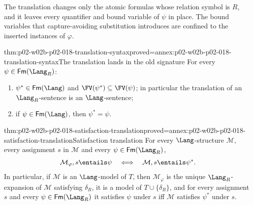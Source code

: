 The translation changes only the atomic formulas whose relation symbol is
\(R\), and it leaves every quantifier and bound variable of \(\psi\) in
place.  The bound variables that capture-avoiding substitution introduces
are confined to the inserted instances of \(\varphi\).

\begin{hblemma}{thm:p02-w02b-p02-018-translation-syntax}{proved=annex:p02-w02b-p02-018-translation-syntax}{The translation lands in the old signature}
For every \(\psi\in\mathsf{Fm}(\Lang_R)\):
\begin{enumerate}
 \item \(\psi^{*}\in\mathsf{Fm}(\Lang)\) and
       \(\FV(\psi^{*})\subseteq\FV(\psi)\); in particular the translation
       of an \(\Lang_R\)-sentence is an \(\Lang\)-sentence;
 \item if \(\psi\in\mathsf{Fm}(\Lang)\), then \(\psi^{*}=\psi\).
\end{enumerate}
\end{hblemma}

\begin{hbtheorem}{thm:p02-w02b-p02-018-satisfaction-translation}{proved=annex:p02-w02b-p02-018-satisfaction-translation}{Satisfaction translation}
For every \(\Lang\)-structure \(\mathcal M\), every assignment \(s\) in
\(\mathcal M\) and every \(\psi\in\mathsf{Fm}(\Lang_R)\),
\[
 \mathcal M_{\varphi},s\entails\psi
 \quad\Longleftrightarrow\quad
 \mathcal M,s\entails\psi^{*}.
\]
In particular, if \(\mathcal M\) is an \(\Lang\)-model of \(T\), then
\(\mathcal M_{\varphi}\) is the unique \(\Lang_R\)-expansion of
\(\mathcal M\) satisfying \(\delta_R\), it is a model of
\(T\cup\{\delta_R\}\), and for every assignment \(s\) and every
\(\psi\in\mathsf{Fm}(\Lang_R)\) it satisfies \(\psi\) under \(s\)
iff \(\mathcal M\) satisfies \(\psi^{*}\) under \(s\).
\end{hbtheorem}

